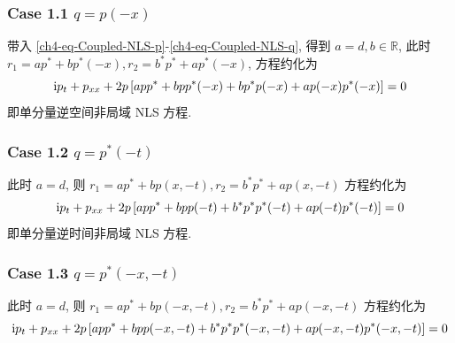 \subsubsection*{Case 1.1 $ q = p(-x) $}
带入 \eqref{ch4-eq-Coupled-NLS-p}-\eqref{ch4-eq-Coupled-NLS-q}, 得到 $ a=d, b \in \mathbb{R} $, 此时$ r_{1} = ap^{*} + bp^{*}(-x), r_{2} = b^{*} p^{*} + ap^{*}(-x) $, 方程约化为
\begin{equation}
    \mathrm{i} p_{t} + p_{xx} + 2p \left[ a p p^{*} + b p p^{*}(-x) + b p^{*} p(-x) + a p(-x) p^{*}(-x) \right] = 0
\end{equation}
即单分量逆空间非局域 NLS 方程.
\subsubsection*{Case 1.2 $ q = p^{*}(-t) $}
此时 $ a=d $, 则 $ r_{1} = a p^{*} + b p(x,-t), r_{2} = b^{*} p^{*} + a p(x,-t) $ 方程约化为
\begin{equation}
    \mathrm{i} p_{t} + p_{xx} + 2p \left[ a p p^{*} + b p p(-t) + b^{*} p^{*} p^{*}(-t) + a p(-t) p^{*}(-t) \right] = 0
\end{equation}
即单分量逆时间非局域 NLS 方程.
\subsubsection*{Case 1.3 $ q = p^{*}(-x,-t) $}
此时 $ a=d $, 则 $ r_{1} = a p^{*} + b p(-x,-t), r_{2} = b^{*} p^{*} + a p(-x,-t) $ 方程约化为
\begin{equation}
    \mathrm{i} p_{t} + p_{xx} + 2p \left[ a p p^{*} + b p p(-x,-t) + b^{*} p^{*} p^{*}(-x,-t) + a p(-x,-t) p^{*}(-x,-t) \right] = 0
\end{equation}

